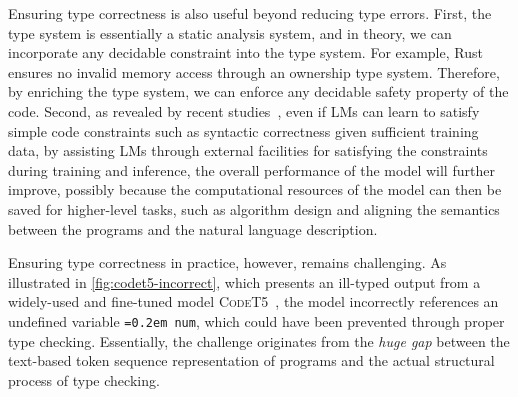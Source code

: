 \documentclass[manuscript,screen]{acmart}
\newcommand{\toolname}[1]{\textsc{#1}}
\newcommand{\tcode}[1]{{\small \texttt{\spaceskip=0.2em #1}}}
\begin{document}
Ensuring type correctness is also useful beyond reducing type errors. 
First, the type system is essentially a static analysis system, and in theory, we can incorporate any decidable constraint into the type system. %
For example, Rust    {\color{revblue}ensures } no invalid memory access through an ownership type system. Therefore, by enriching the type system, we can enforce any decidable safety property of the code. 
Second, as revealed by recent studies~\cite{zhang2025gramtransbettercoderepresentation, DBLP:conf/acl/LiangZ0LLXCZZZC25}, even if LMs can learn to satisfy simple code constraints such as syntactic correctness given sufficient training data, by assisting LMs through external facilities for satisfying the constraints during training and inference, the overall performance of the model will further improve, possibly because the computational resources of the model can then be saved for higher-level tasks, such as algorithm design and aligning the semantics between the programs and the natural language description. 

Ensuring type correctness in practice, however, remains challenging. 
As illustrated in \autoref{fig:codet5-incorrect}, which presents an ill-typed output from a widely-used and fine-tuned model \toolname{CodeT5}~\cite{DBLP:conf/emnlp/0034WJH21}, the model incorrectly references an undefined variable \tcode{num}, which could have been prevented through proper type checking.
Essentially, the challenge originates from the \textit{huge gap} between the text-based token sequence representation of programs and the actual structural process of type checking.
\end{document}
